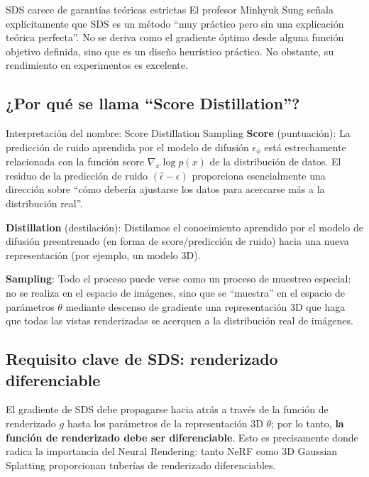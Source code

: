 \documentclass[a4paper]{article}
\begin{document}
\begin{warningbox}{SDS carece de garantías teóricas estrictas}
El profesor Minhyuk Sung señala explícitamente que SDS es un método ``muy práctico pero sin una explicación teórica perfecta''. No se deriva como el gradiente óptimo desde alguna función objetivo definida, sino que es un diseño heurístico práctico. No obstante, su rendimiento en experimentos es excelente.
\end{warningbox}

\subsection{¿Por qué se llama ``Score Distillation''?}

\begin{knowledgebox}{Interpretación del nombre: Score Distillation Sampling}
\textbf{Score} (puntuación): La predicción de ruido aprendida por el modelo de difusión $\epsilon_\phi$ está estrechamente relacionada con la función score $\nabla_x \log p(x)$ de la distribución de datos. El residuo de la predicción de ruido $(\hat{\epsilon} - \epsilon)$ proporciona esencialmente una dirección sobre ``cómo debería ajustarse los datos para acercarse más a la distribución real''.

\textbf{Distillation} (destilación): Distilamos el conocimiento aprendido por el modelo de difusión preentrenado (en forma de score/predicción de ruido) hacia una nueva representación (por ejemplo, un modelo 3D).

\textbf{Sampling}: Todo el proceso puede verse como un proceso de muestreo especial: no se realiza en el espacio de imágenes, sino que se ``muestra'' en el espacio de parámetros $\theta$ mediante descenso de gradiente una representación 3D que haga que todas las vistas renderizadas se acerquen a la distribución real de imágenes.
\end{knowledgebox}

\subsection{Requisito clave de SDS: renderizado diferenciable}

El gradiente de SDS debe propagarse hacia atrás a través de la función de renderizado $g$ hasta los parámetros de la representación 3D $\theta$; por lo tanto, \textbf{la función de renderizado debe ser diferenciable}. Esto es precisamente donde radica la importancia del Neural Rendering: tanto NeRF como 3D Gaussian Splatting proporcionan tuberías de renderizado diferenciables.
\end{document}
